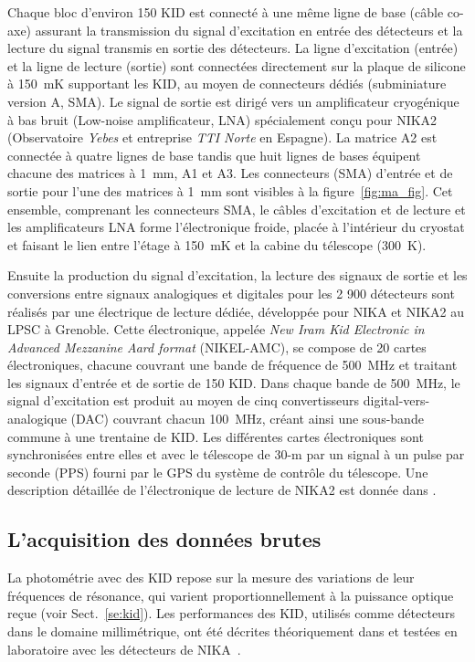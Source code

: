 Chaque bloc d'environ 150 KID est connecté à une même ligne de base
(câble co-axe) assurant la transmission du signal d'excitation en
entrée des détecteurs et la lecture du signal transmis en sortie des
détecteurs. La ligne d'excitation (entrée) et la ligne de lecture
(sortie) sont connectées directement sur la plaque de silicone à 150~mK
supportant les KID, au moyen de connecteurs dédiés (subminiature
version A, SMA). Le signal de sortie est dirigé vers un amplificateur
cryogénique à bas bruit (Low-noise amplificateur, LNA) spécialement
conçu pour NIKA2 (Observatoire \emph{Yebes} et entreprise \emph{TTI
  Norte} en Espagne). La matrice A2 est connectée à quatre lignes de
base tandis que huit lignes de bases équipent chacune des matrices à
1~mm, A1 et A3. Les connecteurs (SMA) d'entrée et de sortie pour l'une
des matrices à 1~mm sont visibles à la
figure~\ref{fig:ma_fig}. Cet ensemble, comprenant les connecteurs SMA,
le câbles d'excitation et de lecture et les amplificateurs LNA forme
l'électronique froide, placée à l'intérieur du cryostat et faisant le
lien entre l'étage à 150~mK et la cabine du télescope (300~K).

Ensuite la production du signal d'excitation, la lecture des signaux
de sortie et les conversions entre signaux analogiques et digitales
pour les 2 900 détecteurs sont réalisés par une électrique de lecture
dédiée, développée pour NIKA et NIKA2 au LPSC à Grenoble. Cette
électronique, appelée \emph{New Iram Kid Electronic in Advanced
  Mezzanine Aard format} (NIKEL-AMC), se compose de 20 cartes
électroniques, chacune couvrant une bande de fréquence de 500~MHz et traitant
les signaux d'entrée et de sortie de 150 KID. Dans chaque bande de
500~MHz, le signal d'excitation est produit au moyen de cinq
convertisseurs digital-vers-analogique (DAC) couvrant chacun 100~MHz,
créant ainsi une sous-bande commune à une trentaine de KID.   
Les différentes cartes électroniques sont synchronisées entre elles et
avec le télescope de 30-m par un signal à un pulse par seconde (PPS)
fourni par le GPS du système de contrôle du télescope. Une description
détaillée de l'électronique de lecture de NIKA2 est donnée dans
\citet{Bourrion2012, Bourrion2016}.



\subsection{L'acquisition des données brutes}
\label{se:rawdata}

La photométrie avec des KID repose sur la mesure des variations de
leur fréquences de résonance, qui varient proportionnellement à la
puissance optique reçue (voir Sect.~\ref{se:kid}). Les performances
des KID, utilisés comme détecteurs dans le domaine millimétrique, ont
été décrites théoriquement dans \citet{Swenson2010} et testées en
laboratoire avec les détecteurs de NIKA~\citep{Monfardini2014JLTP}. 


